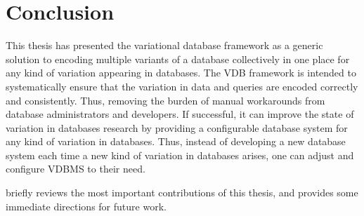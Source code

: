 \chapter{Conclusion}
\label{ch:conclusion}

This thesis has presented the variational database framework as a generic
solution to encoding multiple variants of a database collectively in one place for any 
kind of variation appearing in databases. The VDB framework is intended to
systematically ensure that the variation in data and queries are encoded
correctly and consistently. Thus, removing the burden of manual workarounds
from database administrators and developers. If successful, it can improve 
the state of variation in databases research by providing
a configurable database system for any kind of variation in databases. Thus,
instead of developing a new database system each time a new kind of 
variation in databases arises, one can adjust and configure VDBMS
to their need.

 briefly reviews the most important contributions of this thesis,
and  provides some immediate directions for future work.




